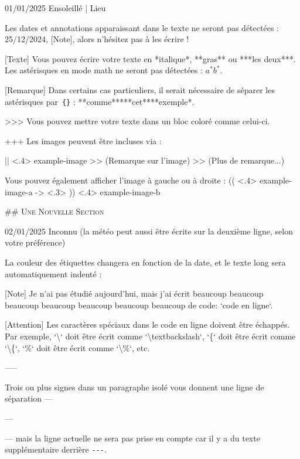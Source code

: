 \documentclass[11pt, paperstyle=light yellow, color entry, day-month-year,
  title in boldface, title in sffamily, use style = classical]{jwjournal}
\begin{document}
01/01/2025 Ensoleillé | Lieu

  Les dates et annotations apparaissant dans le texte ne seront pas détectées : 25/12/2024, [Note], alors n'hésitez pas à les écrire !

  [Texte]
    Vous pouvez écrire votre texte en *italique*, **gras** ou ***les deux***.
    \\
    Les astérisques en mode math ne seront pas détectées : $a^* b^*$.

  [Remarque] Dans certains cas particuliers, il serait nécessaire de séparer les astérisques par~\texttt{\{\}} : **comme**{}***cet***{}*exemple*.

  >>> Vous pouvez mettre votre texte dans un bloc coloré comme celui-ci.

  +++
  Les images peuvent être incluses via :

  || <.4> {example-image} %
  >> (Remarque sur l'image)
  >> (Plus de remarque...)

  Vous pouvez également afficher l'image à gauche ou à droite :
  (( <.4> {example-image-a} %
  -> <.3> %
  )) <.4> {example-image-b} %


## {\textsc{Une Nouvelle Section}}

02/01/2025
Inconnu (la météo peut aussi être écrite sur la deuxième ligne, selon votre préférence)

  La couleur des étiquettes changera en fonction de la date, et le texte long sera automatiquement indenté :

  [Note] Je n'ai pas étudié aujourd'hui, mais j'ai écrit beaucoup beaucoup beaucoup beaucoup beaucoup beaucoup beaucoup de code: `code en ligne`.

  [Attention] Les caractères spéciaux dans le code en ligne doivent être échappés. Par exemple, `\textbackslash` doit être écrit comme `\textbackslash textbackslash`, `\{` doit être écrit comme `\textbackslash\{`, `\%` doit être écrit comme `\textbackslash\%`, etc.

  -----

  Trois ou plus \textquote{\texttt{-}} signes dans un paragraphe isolé vous donnent une ligne de séparation ---

  ---

  --- mais la ligne actuelle ne sera pas prise en compte car il y a du texte supplémentaire derrière \texttt{-}\texttt{-}\texttt{-}.
\end{document}
